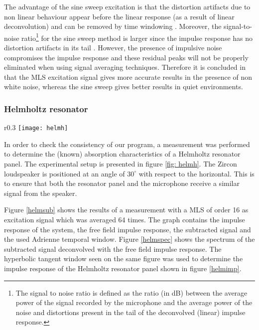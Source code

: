 The advantage of the sine sweep excitation is that the distortion artifacts due to non linear behaviour appear before the linear response (as a result of linear deconvolution) and can be removed by time windowing \cite{Geetere}.  Moreover, the signal-to-noise ratio\footnote{The signal to noise ratio is defined as the ratio (in dB) between the average power of the signal recorded by the microphone and the average
power of the noise and distortions present in the tail of the deconvolved (linear) impulse response.} for the sine sweep method is larger since the impulse response has no distortion artifacts in its tail \cite{Stan}.   However, the presence of impulsive noise compromises the impulse response and these residual peaks will not be properly eliminated when using signal averaging techniques. Therefore it is concluded in \cite{Stan} that the MLS excitation signal gives more accurate results in  the presence of non white noise, whereas the sine sweep gives better results in quiet environments. 






\subsubsection{Helmholtz resonator}

\begin{wrapfigure}{r}{0.3\textwidth}
	\vspace{-60pt}
  \centering
    \texttt{[image: helmh]}
  \caption{Experimental setup for the measurement of the characteristics of the Helmholtz resonator panel.}
  \label{fig: helmh}
  \vspace{-20pt}
\end{wrapfigure}
In order to check the consistency of our program, a measurement was performed to determine the (known) absorption characteristics of a Helmholtz resonator panel. The experimental setup is presented in figure \ref{fig: helmh}. The Zircon loudspeaker is positioned at an angle of $30^{\circ}$ with  respect to the horizontal. This is to ensure that both the resonator panel and the microphone receive a similar signal from the speaker.

Figure \ref{helmsub} shows the results of a measurement with a MLS of order 16 as excitation signal which was averaged 64 times. The graph 
 contains the impulse response of the system, the free field impulse response, the subtracted signal and the used Adrienne temporal window. Figure \ref{helmspec} shows the spectrum of the subtracted signal deconvolved with the free field impulse response. The hyperbolic tangent window seen on the same figure was used to determine the impulse response of the Helmholtz resonator panel shown in figure \ref{helmimp}.
 

